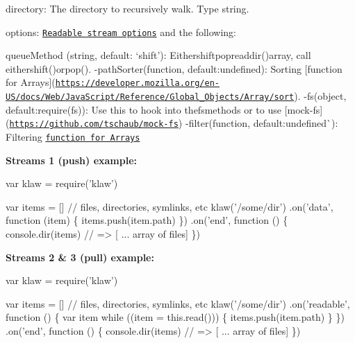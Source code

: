 \begin{DoxyItemize}
\item {\ttfamily directory}\+: The directory to recursively walk. Type {\ttfamily string}.
\item {\ttfamily options}\+: \href{https://nodejs.org/api/stream.html#stream_new_stream_readable_options}{\tt Readable stream options} and the following\+:
\begin{DoxyItemize}
\item {\ttfamily queue\+Method} ({\ttfamily string}, default\+: `\textquotesingle{}shift'{\ttfamily )\+: Either}\textquotesingle{}shift\textquotesingle{}popreaddir(){\ttfamily array, call either}shift(){\ttfamily or}pop(){\ttfamily . -\/}path\+Sorter{\ttfamily (}function{\ttfamily , default\+:}undefined{\ttfamily )\+: Sorting \mbox{[}function for Arrays\mbox{]}(\href{https://developer.mozilla.org/en-US/docs/Web/JavaScript/Reference/Global_Objects/Array/sort}{\tt https\+://developer.\+mozilla.\+org/en-\/\+U\+S/docs/\+Web/\+Java\+Script/\+Reference/\+Global\+\_\+\+Objects/\+Array/sort}). -\/}fs{\ttfamily (}object{\ttfamily , default\+:}require(\textquotesingle{}fs\textquotesingle{}){\ttfamily )\+: Use this to hook into the}fs{\ttfamily methods or to use \mbox{[}}mock-\/fs{\ttfamily \mbox{]}(\href{https://github.com/tschaub/mock-fs}{\tt https\+://github.\+com/tschaub/mock-\/fs}) -\/}filter{\ttfamily (}function{\ttfamily , default\+:}undefined\`{})\+: Filtering \href{https://developer.mozilla.org/en-US/docs/Web/JavaScript/Reference/Global_Objects/Array/filter}{\tt function for Arrays}
\end{DoxyItemize}
\end{DoxyItemize}

{\bfseries Streams 1 (push) example\+:}


\begin{DoxyCode}
var klaw = require('klaw')

var items = [] // files, directories, symlinks, etc
klaw('/some/dir')
  .on('data', function (item) \{
    items.push(item.path)
  \})
  .on('end', function () \{
    console.dir(items) // => [ ... array of files]
  \})
\end{DoxyCode}


{\bfseries Streams 2 \& 3 (pull) example\+:}


\begin{DoxyCode}
var klaw = require('klaw')

var items = [] // files, directories, symlinks, etc
klaw('/some/dir')
  .on('readable', function () \{
    var item
    while ((item = this.read())) \{
      items.push(item.path)
    \}
  \})
  .on('end', function () \{
    console.dir(items) // => [ ... array of files]
  \})
\end{DoxyCode}


